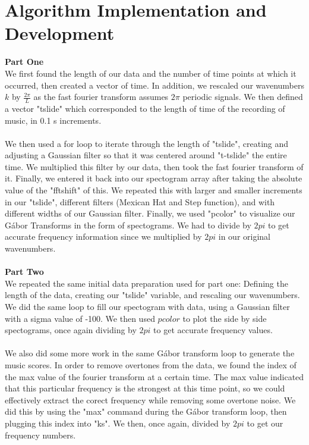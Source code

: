\documentclass{article}
\begin{document}
\section*{\fontsize{19}{15}\selectfont Algorithm Implementation and Development}
\textbf{Part One} \\
We first found the length of our data and the number of time points at which it occurred, then created a vector of time. 
In addition, we rescaled our wavenumbers $k$ by $\frac{2\pi}{L}$ as the fast fourier transform assumes $2\pi$ periodic signals. We then defined a vector "tslide" which corresponded to the length of time of the recording of music, in 0.1 s increments. \\ \\
We then used a for loop to iterate through the length of "tslide", creating and adjusting a Gaussian filter so that it was centered around "t-tslide" the entire time. We multiplied this filter by our data, then took the fast fourier transform of it. Finally, we entered it back into our spectogram array after taking the absolute value of the "fftshift" of this. We repeated this with larger and smaller increments in our "tslide", different filters (Mexican Hat and Step function), and with different widths of our Gaussian filter. Finally, we used "pcolor" to visualize our G\'abor Transforms in the form of spectograms. We had to divide by $2pi$ to get accurate frequency information since we multiplied by $2pi$ in our original wavenumbers. \\ \\
\textbf{Part Two} \\
We repeated the same initial data preparation used for part one: Defining the length of the data, creating our "tslide" variable, and rescaling our wavenumbers. We did the same loop to fill our spectogram with data, using a Gaussian filter with a sigma value of -100. We then used $pcolor$ to plot the side by side spectograms, once again dividing by $2pi$ to get accurate frequency values. \\ \\
We also did some more work in the same G\'abor transform loop to generate the music scores. In order to remove overtones from the data, we found the index of the max value of the fourier transform at a certain time. The max value indicated that this particular frequency is the strongest at this time point, so we could effectively extract the corect frequency while removing some overtone noise. We did this by using the "max" command during the G\'abor transform loop, then plugging this index into "ks". We then, once again, divided by $2pi$ to get our frequency numbers.
\end{document}
